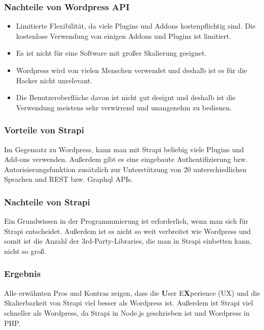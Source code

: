 \subsubsection{Nachteile von Wordpress API}
\begin{itemize}
    \item  Limitierte Flexibilität, da viele Plugins und Addons kostenpflichtig sind.
          Die kostenlose Verwendung von einigen Addons und Plugins ist limitiert.
    \item Es ist nicht für eine Software mit großer Skalierung geeignet.
    \item Wordpress wird von vielen Menschen verwendet und deshalb ist es für die Hacker nicht unrelevant.
    \item Die Benutzeroberfläche davon ist nicht gut designt und deshalb ist die Verwendung meistens sehr verwirrend und unangenehm zu bedienen.
\end{itemize}
\cite{strapi-vs-wordpress}

\subsubsection{Vorteile von Strapi}

Im Gegensatz zu Wordpress, kann man mit Strapi beliebig viele Plugins und Add-ons
verwenden. Außerdem gibt es eine eingebaute Authentifizierung bzw. Autorisierungsfunktion
zusätzlich zur Unterstützung von 20 unterschiedlichen Sprachen und REST
bzw. Graphql APIs.
\cite{strapi-vs-wordpress}

\subsubsection{Nachteile von Strapi}
Ein Grundwissen in der Programmmierung ist erforderlich, wenn man sich für Strapi
entscheidet. Außerdem ist es nicht so weit verbreitet wie Wordpress und somit ist die Anzahl
der 3rd-Party-Libraries, die man in Strapi einbetten kann, nicht so groß.
\cite{strapi-vs-wordpress}

\subsubsection{Ergebnis}
Alle erwähnten Pros und Kontras zeigen, dass  die \textbf{U}ser E\textbf{X}perience (UX)
und die Skalierbarkeit von Strapi viel besser als Wordpress ist.
Außerdem ist Strapi viel schneller als Wordpress,
da Strapi in Node.js geschrieben ist und Wordpress in PHP.
\cite{strapi-vs-wordpress}

